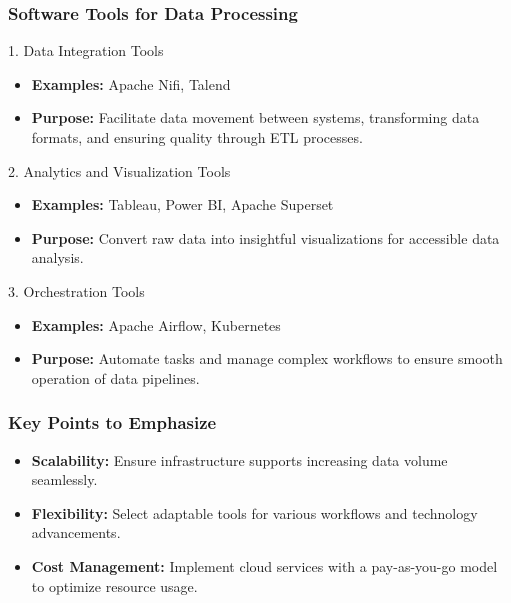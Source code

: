 \documentclass[aspectratio=169]{beamer}
\begin{document}
\begin{frame}[fragile]
    \frametitle{Software Tools for Data Processing}
    \begin{block}{1. Data Integration Tools}
        \begin{itemize}
            \item \textbf{Examples:} Apache Nifi, Talend
            \item \textbf{Purpose:} Facilitate data movement between systems, transforming data formats, and ensuring quality through ETL processes.
        \end{itemize}
    \end{block}
    
    \begin{block}{2. Analytics and Visualization Tools}
        \begin{itemize}
            \item \textbf{Examples:} Tableau, Power BI, Apache Superset
            \item \textbf{Purpose:} Convert raw data into insightful visualizations for accessible data analysis.
        \end{itemize}
    \end{block}
    
    \begin{block}{3. Orchestration Tools}
        \begin{itemize}
            \item \textbf{Examples:} Apache Airflow, Kubernetes
            \item \textbf{Purpose:} Automate tasks and manage complex workflows to ensure smooth operation of data pipelines.
        \end{itemize}
    \end{block}
\end{frame}

\begin{frame}[fragile]
    \frametitle{Key Points to Emphasize}
    \begin{itemize}
        \item \textbf{Scalability:} Ensure infrastructure supports increasing data volume seamlessly.
        \item \textbf{Flexibility:} Select adaptable tools for various workflows and technology advancements.
        \item \textbf{Cost Management:} Implement cloud services with a pay-as-you-go model to optimize resource usage.
    \end{itemize}
\end{frame}
\end{document}
